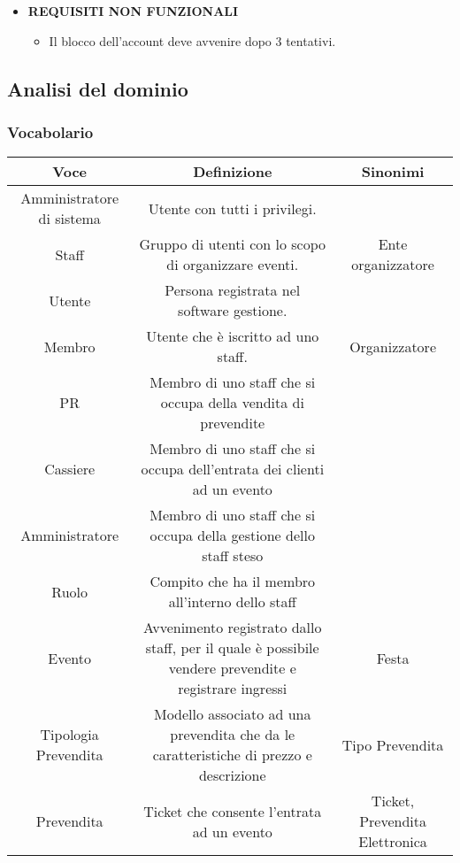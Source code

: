 \documentclass[a4paper]{article}
\begin{document}
\begin{itemize}
	
    
    \item \textbf{REQUISITI NON FUNZIONALI}
	
	\begin{itemize}
		\item Il blocco dell'account deve avvenire dopo 3 tentativi.
	\end{itemize}
	
\end{itemize}

\newpage

\subsection{Analisi del dominio}

\subsubsection{Vocabolario}

\begin{table}[ht!]
  \begin{center}
    \begin{tabulary}{1\textwidth}{c|C|C}
      \textbf{Voce} & \textbf{Definizione} & \textbf{Sinonimi}\\
      \hline
		Amministratore di sistema & Utente con tutti i privilegi. & \\
        Staff & Gruppo di utenti con lo scopo di organizzare eventi. & Ente organizzatore \\
        Utente & Persona registrata nel software gestione. & \\
        Membro & Utente che è iscritto ad uno staff. & Organizzatore \\
		PR & Membro di uno staff che si occupa della vendita di prevendite & \\
		Cassiere & Membro di uno staff che si occupa dell'entrata dei clienti ad un evento & \\
		Amministratore & Membro di uno staff che si occupa della gestione dello staff steso & \\
        Ruolo & Compito che ha il membro all'interno dello staff & \\
        Evento & Avvenimento registrato dallo staff, per il quale è possibile vendere prevendite e registrare ingressi & Festa \\
        Tipologia Prevendita & Modello associato ad una prevendita che da le caratteristiche di prezzo e descrizione & Tipo Prevendita \\
        Prevendita & Ticket che consente l'entrata ad un evento & Ticket, Prevendita Elettronica
    \end{tabulary}
  \end{center}
\end{table}

\end{document}
